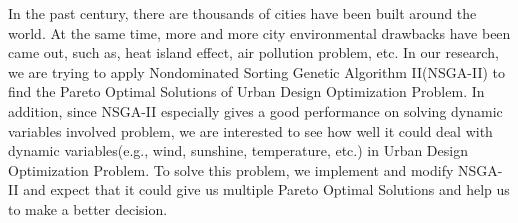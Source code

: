 \iffalse
In your thesis document, you should have a good abstract that can answer the following questions: (1) What is the problem you worked on, (2) Why is it interesting or motivation for working on this problem, (3) How did you achieve the solution or What did you do?, and (4) How well did your idea work out?
\fi

In the past century, there are thousands of cities have been built around the world. At the same time, more and more city environmental drawbacks have been came out, such as, heat island effect, air pollution problem, etc. In our research, we are trying to apply Nondominated Sorting Genetic Algorithm II(NSGA-II) to find the Pareto Optimal Solutions of Urban Design Optimization Problem. In addition, since NSGA-II especially gives a good performance on solving dynamic variables involved problem, we are interested to see how well it could deal with dynamic variables(e.g., wind, sunshine, temperature, etc.) in Urban Design Optimization Problem. To solve this problem, we implement and modify NSGA-II and expect that it could give us multiple Pareto Optimal Solutions and help us to make a better decision.
